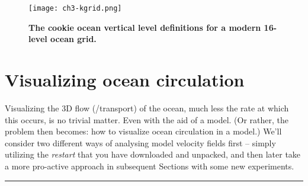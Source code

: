 \begin{figure}
\texttt{[image: ch3-kgrid.png]}\centering
\vspace{-0mm}
\caption{\textbf{The \textbf{cookie} ocean vertical level definitions for a modern 16-level ocean grid.}}
\label{fig:ch3-kgrid}
\end{figure}

\newpage

\section{Visualizing ocean circulation}

Visualizing the 3D flow (/transport) of the ocean, much less the rate at which this occurs, is no trivial matter. Even with the aid of a model. (Or rather, the problem then becomes: how to visualize ocean circulation in a model.) We'll consider two different ways of analysing model velocity fields first -- simply utilizing the \textit{restart} that you have downloaded and unpacked, and then later take a more pro-active approach in subsequent Sections with some new experiments.

\vspace{1mm}
\noindent\rule{4cm}{0.5pt}
\vspace{2mm}

